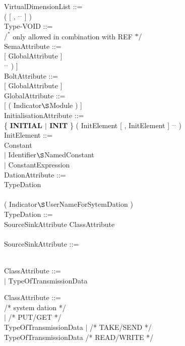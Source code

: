 VirtualDimensionList ::=\\
\x ( [ , $^{...}$ ] )\\

Type-VOID ::=\\
 \x $/^*$ only allowed in combination with REF $*/$\\

SemaAttribute ::=\\
 [ GlobalAttribute ]\\
\x [ {\bf PRESET} ( Constant-FIXED-Expression [ , Constant-FIXED-Expression ] $^{...}$ ) ]\\

BoltAttribute ::=\\
 [ GlobalAttribute ]\\

GlobalAttribute ::=\\
 [ ( Indicator$\S $Module ) ]\\

InitialisationAttribute ::=\\
\x \{ {\bf INITIAL $\mid$ INIT} \} ( InitElement [ , InitElement ] $^{...}$ )\\

InitElement ::=\\
\x Constant\\
\x $\mid$ Identifier$\S $NamedConstant\\
\x $\mid$ ConstantExpression\\

DationAttribute ::=\\
\x TypeDation\\
\x [ GlobalAttribute ]\\
 ( Indicator$\S $UserNameForSytemDation )\\

TypeDation ::=\\
 SourceSinkAttribute  ClassAttribute\\
\x [ Topology ] [ AccessAttribute ]\\

SourceSinkAttribute ::=\\
\\

\begin{removed}
ClassAttribute ::= \\
 $\mid$ TypeOfTransmissionData\\
\end{removed}
\begin{added}
ClassAttribute ::= \\
\x [ {\bf SYSTEM} ]                     /* system dation */\\
\x {} $\mid$                  /* PUT/GET */ \\ 
\x {}  TypeOfTransmissionData $\mid$  /* TAKE/SEND */\\
\x \x  TypeOfTransmissionData               /* READ/WRITE */ \\
\end{added}

